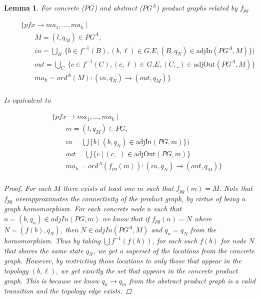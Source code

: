 \documentclass[twocolumn, openany]{sig-alternate-10pt}
\newtheorem{lem}[thm]{Lemma}
\begin{document}
\begin{lem}

  For concrete ($PG$) and abstract ($PG^A$) product graphs related by $f_{pg}$

  \[ \begin{array}{l}
     ~~~~~~~~~ \{ pfx \rightarrow ma_1, \dots, ma_k ~\vert~ \\
     ~~~~~~~~~~~~~~~~~~ M = (l,q_M) \in PG^A, \\
     ~~~~~~~~~~~~~~~~~~ in = \bigcup_B~ \{ b \in f^{-1}(B), (b,\ell) \in G.E, (B,q_N) \in \text{adjIn}(PG^A,M) \}) \\
     ~~~~~~~~~~~~~~~~~~ out = \bigcup_C~ \{ c \in f^{-1}(C), (c,\ell) \in G.E, (C,\_) \in \text{adjOut}(PG^A,M) \} \\
     ~~~~~~~~~~~~~~~~~~ ma_h = ord^A(M) : (in,q_N) \rightarrow (out,q_M) \} \\
  \end{array} \]%

  Is equivalent to

  \[ \begin{array}{l}
     ~~~~~~~~~ \{ pfx \rightarrow ma_1, \dots, ma_k ~\vert~ \\
     ~~~~~~~~~~~~~~~~~~ m = (l,q_M) \in PG, \\
     ~~~~~~~~~~~~~~~~~~ in = \bigcup \{ b ~\vert~ (b,q_N) \in \text{adjIn}(PG,m) \}) \\
     ~~~~~~~~~~~~~~~~~~ out = \bigcup \{ c ~\vert~ (c,\_) \in \text{adjOut}(PG,m) \} \\
     ~~~~~~~~~~~~~~~~~~ ma_h = ord^A(f_{pg}(m)) : (in,q_N) \rightarrow (out,q_M) \} \\
  \end{array} \]%

  \begin{proof}
    For each $M$ there exists at least one $m$ such that $f_{pg}(m) = M$. Note that $f_{pg}$ overapproximates the connectivity of the product graph, by virtue of being a graph homomorphism. For each concrete node $n$ such that $n = (b,q_n) \in adjIn(PG,m)$ we know that if $f_{pg}(n) = N$ where $N = (f(b),q_N)$, then $N \in adjIn(PG^A,M)$ and $q_n = q_N$ from the homomorphism. Thus by taking $\bigcup f^{-1}(f(b))$, for each such $f(b)$ for node $N$ that shares the same state $q_N$, we get a superset of the locations from the concrete graph. However, by restricting those locations to only those that appear in the topology $(b,\ell)$, we get exactly the set that appears in the concrete product graph. This is because we know $q_n \rightarrow q_m$ from the abstract product graph is a valid transition and the topology edge exists.
  \end{proof}

\end{lem}
\end{document}
